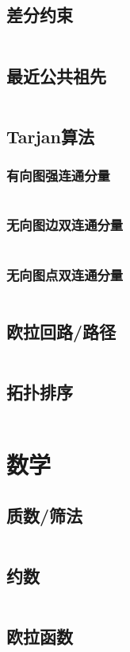 \documentclass[a4paper,12pt]{article}
\begin{document}
\subsection{差分约束} %
\inputminted[breaklines]{c++}{graph/cfys/cfys.cc}
\subsection{最近公共祖先} %
\inputminted[breaklines]{c++}{graph/lca/lca.cc}
\subsection{Tarjan算法} %
\subsubsection{有向图强连通分量} 
\inputminted[breaklines]{c++}{graph/tarjan/scc.cc}
\subsubsection{无向图边双连通分量} 
\inputminted[breaklines]{c++}{graph/tarjan/edcc.cc}
\subsubsection{无向图点双连通分量} 
\inputminted[breaklines]{c++}{graph/tarjan/vdcc.cc}
\subsection{欧拉回路/路径} %
\inputminted[breaklines]{c++}{graph/eluer/eluer.cc}
\subsection{拓扑排序} %
\inputminted[breaklines]{c++}{graph/topsort/top.cc}

\newpage
\section{数学}
\subsection{质数/筛法}
\inputminted[breaklines]{c++}{math/prime.cc}
\subsection{约数}
\inputminted[breaklines]{c++}{math/yueshu.cc}
\subsection{欧拉函数}
\inputminted[breaklines]{c++}{math/eluer.cc}
\end{document}
